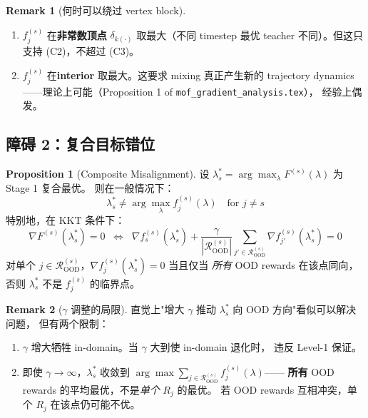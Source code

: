 \documentclass[11pt,a4paper]{article}
\newcommand{\OOD}{\mathrm{OOD}}
\theoremstyle{definition}
\newtheorem{remark}{Remark}
\newtheorem{proposition}{Proposition}
\begin{document}
\begin{remark}[何时可以绕过 vertex block]
\begin{enumerate}[leftmargin=1.5em]
\item $f_j^{(s)}$ 在\textbf{非常数顶点} $\delta_{k(\cdot)}$ 取最大（不同 timestep
最优 teacher 不同）。但这只支持 (C2)，不超过 (C3)。
\item $f_j^{(s)}$ 在\textbf{interior} 取最大。这要求 mixing 真正产生新的
trajectory dynamics——理论上可能（Proposition 1 of \texttt{mof\_gradient\_analysis.tex}），
经验上偶发。
\end{enumerate}
\end{remark}

\subsection{障碍 2：复合目标错位}

\begin{proposition}[Composite Misalignment]
\label{prop:composite_misalign}
设 $\lambda_s^* = \arg\max_\lambda F^{(s)}(\lambda)$ 为 Stage 1 复合最优。
则在一般情况下：
\begin{equation}
\lambda_s^* \neq \arg\max_\lambda f_j^{(s)}(\lambda) \quad\text{for } j \neq s
\label{eq:composite_misalign}
\end{equation}
特别地，在 KKT 条件下：
\begin{equation}
\nabla F^{(s)}(\lambda_s^*) = 0
\;\;\Leftrightarrow\;\;
\nabla f_s^{(s)}(\lambda_s^*) + \frac{\gamma}{|\mathcal{R}_{\OOD}^{(s)}|}\sum_{j' \in \mathcal{R}_{\OOD}^{(s)}} \nabla f_{j'}^{(s)}(\lambda_s^*) = 0
\label{eq:kkt}
\end{equation}
对单个 $j \in \mathcal{R}_{\OOD}^{(s)}$，$\nabla f_j^{(s)}(\lambda_s^*) = 0$
当且仅当 \emph{所有} OOD rewards 在该点同向，否则 $\lambda_s^*$ 不是 $f_j^{(s)}$ 的临界点。
\end{proposition}

\begin{remark}[$\gamma$ 调整的局限]
直觉上"增大 $\gamma$ 推动 $\lambda_s^*$ 向 OOD 方向"看似可以解决问题，
但有两个限制：
\begin{enumerate}[leftmargin=1.5em]
\item $\gamma$ 增大牺牲 in-domain。当 $\gamma$ 大到使 in-domain 退化时，
违反 Level-1 保证。
\item 即使 $\gamma \to \infty$，$\lambda_s^*$ 收敛到
$\arg\max \sum_{j \in \mathcal{R}_{\OOD}^{(s)}} f_j^{(s)}(\lambda)$——
\textbf{所有} OOD rewards 的平均最优，不是\emph{单个} $R_j$ 的最优。
若 OOD rewards 互相冲突，单个 $R_j$ 在该点仍可能不优。
\end{enumerate}
\end{remark}
\end{document}
